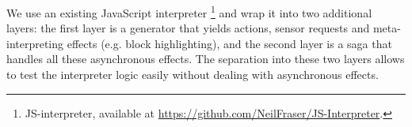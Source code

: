 
We use an existing JavaScript interpreter%
\footnote{JS-interpreter, available at \url{https://github.com/NeilFraser/JS-Interpreter}.}
and wrap it into two
additional layers: the first layer is a generator
that yields actions, sensor requests and
meta-interpreting effects (e.g. block highlighting), %
and the second layer is a saga
that handles all these asynchronous effects.
The separation into these two layers allows to test the interpreter logic
easily without dealing with asynchronous effects.
